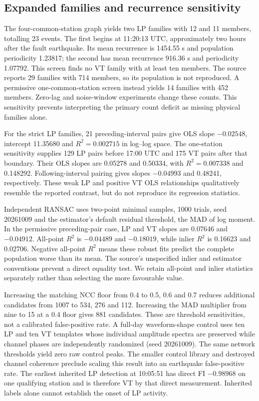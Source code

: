 \documentclass[11pt]{article}
\begin{document}
\subsection{Expanded families and recurrence sensitivity}
The four-common-station graph yields two LP families with 12 and 11 members, totalling 23 events. The first begins at 11:20:13 UTC, approximately two hours after the fault earthquake. Its mean recurrence is 1454.55 s and population periodicity 1.23817; the second has mean recurrence 916.36 s and periodicity 1.07792. This screen finds no VT family with at least ten members. The source reports 29 families with 714 members, so its population is not reproduced. A permissive one-common-station screen instead yields 14 families with 452 members. Zero-lag and noise-window experiments change these counts. This sensitivity prevents interpreting the primary count deficit as missing physical families alone.

For the strict LP families, 21 preceding-interval pairs give OLS slope $-0.02548$, intercept 11.35680 and $R^2=0.002715$ in log--log space. The one-station sensitivity supplies 129 LP pairs before 17:00 UTC and 175 VT pairs after that boundary. Their OLS slopes are 0.05278 and 0.50334, with $R^2=0.007338$ and 0.148292. Following-interval pairing gives slopes $-0.04993$ and 0.48241, respectively. These weak LP and positive VT OLS relationships qualitatively resemble the reported contrast, but do not reproduce its regression statistics.

Independent RANSAC uses two-point minimal samples, 1000 trials, seed 20261009 and the estimator's default residual threshold, the MAD of log moment. In the permissive preceding-pair case, LP and VT slopes are 0.07646 and $-0.04912$. All-point $R^2$ is $-0.04489$ and $-0.18019$, while inlier $R^2$ is 0.16623 and 0.02706. Negative all-point $R^2$ means these robust fits predict the complete population worse than its mean. The source's unspecified inlier and estimator conventions prevent a direct equality test. We retain all-point and inlier statistics separately rather than selecting the more favourable value.

Increasing the matching NCC floor from 0.4 to 0.5, 0.6 and 0.7 reduces additional candidates from 1007 to 534, 276 and 112. Increasing the MAD multiplier from nine to 15 at a 0.4 floor gives 881 candidates. These are threshold sensitivities, not a calibrated false-positive rate. A full-day waveform-shape control uses ten LP and ten VT templates whose individual amplitude spectra are preserved while channel phases are independently randomized (seed 20261009). The same network thresholds yield zero raw control peaks. The smaller control library and destroyed channel coherence preclude scaling this result into an earthquake false-positive rate. The earliest inherited LP detection at 10:05:51 has direct FI $-0.98968$ on one qualifying station and is therefore VT by that direct measurement. Inherited labels alone cannot establish the onset of LP activity.
\end{document}
